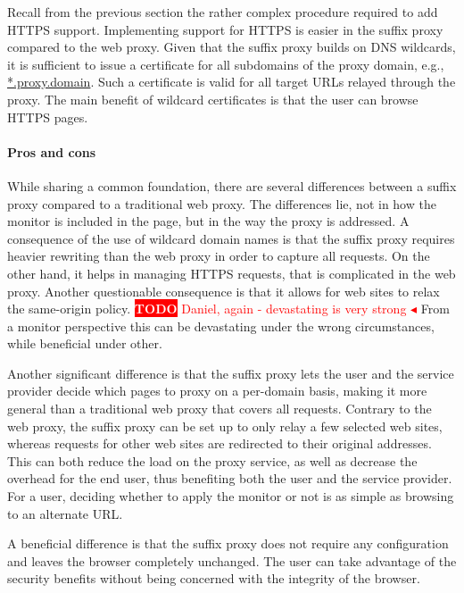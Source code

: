 \documentclass{llncs}
\newcommand{\todo}[1]{\colorbox{red}{\textcolor{white}{\sffamily\bfseries\scriptsize TODO}} \textcolor{red}{#1} \textcolor{red}{$\blacktriangleleft$}}
\begin{document}
Recall from the previous section the rather complex procedure required to add HTTPS support.
Implementing support for HTTPS is easier in the suffix proxy compared to the web proxy. 
Given that the suffix proxy builds on DNS wildcards, it is sufficient to issue a certificate
for all subdomains of the proxy domain, e.g., \url{*.proxy.domain}. Such a 
certificate is valid for all target URLs relayed through the proxy.
The main benefit of wildcard certificates is that the user can browse HTTPS pages. 

\paragraph{Pros and cons}

While sharing a common foundation, there are several differences between a 
suffix proxy compared to a traditional web proxy. The differences lie, not in 
how the monitor is included in the page, but in the way the proxy is 
addressed. A consequence of the use of wildcard domain names is that the suffix proxy requires 
heavier rewriting than the web proxy in order to capture all requests. On the other 
hand, it helps in managing HTTPS requests, that is complicated in the web proxy.
Another questionable consequence is that it allows for web sites to relax the 
same-origin policy. 
\todo{Daniel, again - devastating is very strong}
From a monitor perspective this can be devastating under the wrong circumstances, 
while beneficial under other.

Another significant difference is that the suffix proxy lets the user and the 
service provider decide which pages to proxy on a per-domain basis, making it 
more general than a traditional web proxy that covers all requests. 
Contrary to the web proxy, the suffix proxy can be set up to only relay a few selected 
web sites, whereas requests for other web sites are redirected to their original 
addresses. This can both reduce the load on the proxy service, as well as decrease the 
overhead for the end user, thus benefiting both the user and the service provider.
For a user, deciding whether to apply the monitor or not is as simple as browsing 
to an alternate URL.

A beneficial difference is that the suffix proxy does not require any 
configuration and leaves the browser completely unchanged. The user can take
advantage of the security benefits without being concerned with the integrity 
of the browser.
\end{document}
